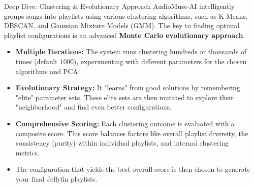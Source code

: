 \documentclass{beamer}
\begin{document}
\begin{frame}{Deep Dive: Clustering \& Evolutionary Approach}
    AudioMuse-AI intelligently groups songs into playlists using various clustering algorithms, such as K-Means, DBSCAN, and Gaussian Mixture Models (GMM). The key to finding optimal playlist configurations is an advanced \textbf{Monte Carlo evolutionary approach}.

    \begin{itemize}
        \item \textbf{Multiple Iterations:} The system runs clustering hundreds or thousands of times (default 1000), experimenting with different parameters for the chosen algorithms and PCA.
        \item \textbf{Evolutionary Strategy:} It "learns" from good solutions by remembering "elite" parameter sets. These elite sets are then mutated to explore their "neighborhood" and find even better configurations.
        \item \textbf{Comprehensive Scoring:} Each clustering outcome is evaluated with a composite score. This score balances factors like overall playlist diversity, the consistency (purity) within individual playlists, and internal clustering metrics.
        \item The configuration that yields the best overall score is then chosen to generate your final Jellyfin playlists.
    \end{itemize}
\end{frame}
\end{document}
